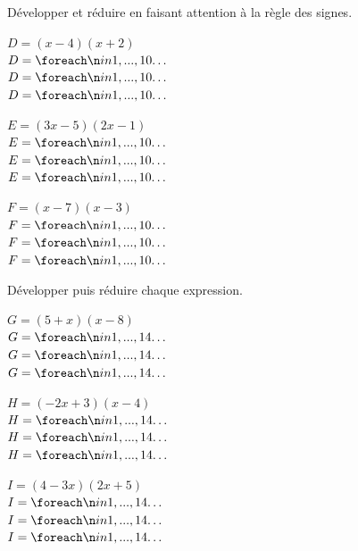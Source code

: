 \documentclass[a4paper]{book}
\begin{document}
    \begin{exercice}
        Développer et réduire en faisant attention à la règle des signes.
        \vspace{0.3cm}
        
        \begin{minipage}[t]{0.31\textwidth}
        $D = (x - 4)(x + 2)$ \\[2ex]
        $D = \points[10]$ \\[2ex]
        $D = \points[10]$ \\[2ex]
        $D = \points[10]$
        \end{minipage}
        \hfill \vline\hfill
        \begin{minipage}[t]{0.31\textwidth}
        $E = (3x - 5)(2x - 1)$ \\[2ex]
        $E = \points[10]$ \\[2ex]
        $E = \points[10]$ \\[2ex]
        $E = \points[10]$
        \end{minipage}
        \hfill\vline\hfill
        \begin{minipage}[t]{0.31\textwidth}
        $F = (x - 7)(x - 3)$ \\[2ex]
        $F = \points[10]$ \\[2ex]
        $F = \points[10]$ \\[2ex]
        $F = \points[10]$
        \end{minipage}
    \end{exercice}
    
    \vspace{0.6cm}
    
    \begin{exercice}
        Développer puis réduire chaque expression.
        \vspace{0.3cm}
        
        \begin{minipage}[t]{0.31\textwidth}
        $G = (5 + x)(x - 8)$ \\[2ex]
        $G = \points[14]$ \\[2ex]
        $G = \points[14]$ \\[2ex]
        $G = \points[14]$
        \end{minipage}
        \hfill\vline\hfill
        \begin{minipage}[t]{0.31\textwidth}
        $H = (-2x + 3)(x - 4)$ \\[2ex]
        $H = \points[14]$ \\[2ex]
        $H = \points[14]$ \\[2ex]
        $H = \points[14]$
        \end{minipage}
        \hfill\vline\hfill
        \begin{minipage}[t]{0.31\textwidth}
        $I = (4 - 3x)(2x + 5)$ \\[2ex]
        $I = \points[14]$ \\[2ex]
        $I = \points[14]$ \\[2ex]
        $I = \points[14]$
        \end{minipage}
    \end{exercice}
\end{document}
